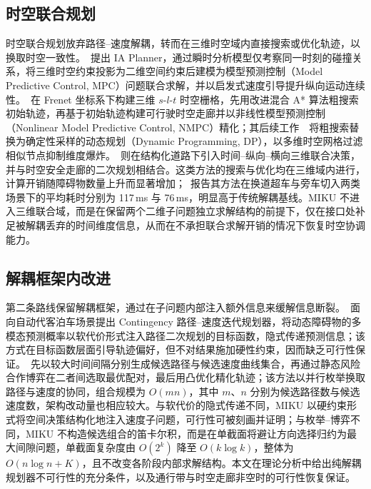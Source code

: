 \documentclass[a4paper,11pt]{ctexart}
\theoremstyle{definition}
\begin{document}
\subsection{时空联合规划}
\label{sec:related-joint}

时空联合规划放弃路径--速度解耦，转而在三维时空域内直接搜索或优化轨迹，以换取时空一致性。\citet{yang2021_ia_planner}~提出 IA Planner，通过瞬时分析模型仅考察同一时刻的碰撞关系，将三维时空约束投影为二维空间约束后建模为模型预测控制（Model Predictive Control, MPC）问题联合求解，并以启发式速度引导提升纵向运动连续性。\citet{hu2023_hybrid_astar_slt}~在 Frenet 坐标系下构建三维 $s$-$l$-$t$ 时空栅格，先用改进混合 A* 算法粗搜索初始轨迹，再基于初始轨迹构建可行驶时空走廊并以非线性模型预测控制（Nonlinear Model Predictive Control, NMPC）精化；其后续工作~\citep{hu2025_dp_nmpc}~将粗搜索替换为确定性采样的动态规划（Dynamic Programming, DP），以多维时空网格过滤相似节点抑制维度爆炸。\citet{qiao2025stjoint}~则在结构化道路下引入时间--纵向--横向三维联合决策，并与时空安全走廊的二次规划相结合。这类方法的搜索与优化均在三维域内进行，计算开销随障碍物数量上升而显著增加；\citet{hu2023_hybrid_astar_slt}~报告其方法在换道超车与旁车切入两类场景下的平均耗时分别为 117\,ms 与 76\,ms，明显高于传统解耦基线。MIKU 不进入三维联合域，而是在保留两个二维子问题独立求解结构的前提下，仅在接口处补足被解耦丢弃的时间维度信息，从而在不承担联合求解开销的情况下恢复时空协调能力。

\subsection{解耦框架内改进}
\label{sec:related-decoupled}

第二条路线保留解耦框架，通过在子问题内部注入额外信息来缓解信息断裂。\citet{han2026_contingency}~面向自动代客泊车场景提出 Contingency 路径--速度迭代规划器，将动态障碍物的多模态预测概率以软代价形式注入路径二次规划的目标函数，隐式传递预测信息；该方式在目标函数层面引导轨迹偏好，但不对结果施加硬性约束，因而缺乏可行性保证。\citet{zhang2023_dp_rcg}~先以较大时间间隔分别生成候选路径与候选速度曲线集合，再通过静态风险合作博弈在二者间选取最优配对，最后用凸优化精化轨迹；该方法以并行枚举换取路径与速度的协同，组合规模为 $O(mn)$，其中 $m$、$n$ 分别为候选路径数与候选速度数，架构改动量也相应较大。与软代价的隐式传递不同，MIKU 以硬约束形式将空间决策结构化地注入速度子问题，可行性可被刻画并证明；与枚举--博弈不同，MIKU 不构造候选组合的笛卡尔积，而是在单截面将避让方向选择归约为最大间隙问题，单截面复杂度由 $O(2^k)$ 降至 $O(k\log k)$，整体为 $O(n\log n + K)$，且不改变各阶段内部求解结构。本文在理论分析中给出纯解耦规划器不可行性的充分条件，以及通行带与时空走廊非空时的可行性恢复保证。
\end{document}
